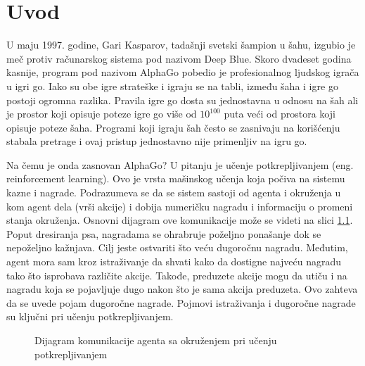 \chapter{Uvod}



U maju 1997. godine, Gari Kasparov, tadašnji svetski šampion u šahu, izgubio je meč protiv računarskog sistema pod nazivom Deep Blue. Skoro dvadeset godina kasnije, program pod nazivom AlphaGo pobedio je profesionalnog ljudskog igrača u igri go. Iako su obe igre strateške i igraju se na tabli, između šaha i igre go postoji ogromna razlika. Pravila igre go dosta su jednostavna u odnosu na šah ali je prostor koji opisuje poteze igre go više od $10^{100}$ puta veći od prostora koji opisuje poteze šaha. Programi koji igraju šah često se zasnivaju na korišćenju stabala pretrage i ovaj pristup jednostavno nije primenljiv na igru go. \par

Na čemu je onda zasnovan AlphaGo? U pitanju je učenje potkrepljivanjem (eng. reinforcement learning). Ovo je vrsta mašinskog učenja koja počiva na sistemu kazne i nagrade. Podrazumeva se da se sistem sastoji od agenta i okruženja u kom agent dela (vrši akcije) i dobija numeričku nagradu i informaciju o promeni stanja okruženja. Osnovni dijagram ove komunikacije može se videti na slici \ref{fig:rl_diag}. Poput dresiranja psa, nagradama se ohrabruje poželjno ponašanje dok se nepoželjno kažnjava. Cilj jeste ostvariti što veću dugoročnu nagradu. Međutim, agent mora sam kroz istraživanje da shvati kako da dostigne najveću nagradu tako što isprobava različite akcije. Takođe, preduzete akcije mogu da utiču i na nagradu koja se pojavljuje dugo nakon što je sama akcija preduzeta. Ovo zahteva da se uvede pojam dugoročne nagrade. Pojmovi istraživanja i dugoročne nagrade su ključni pri učenju potkrepljivanjem. 

\begin{figure}
	\centering
	\resizebox{.4\linewidth}{!}{}
	\caption{Dijagram komunikacije agenta sa okruženjem pri učenju potkrepljivanjem}
	\label{fig:rl_diag}
\end{figure}

